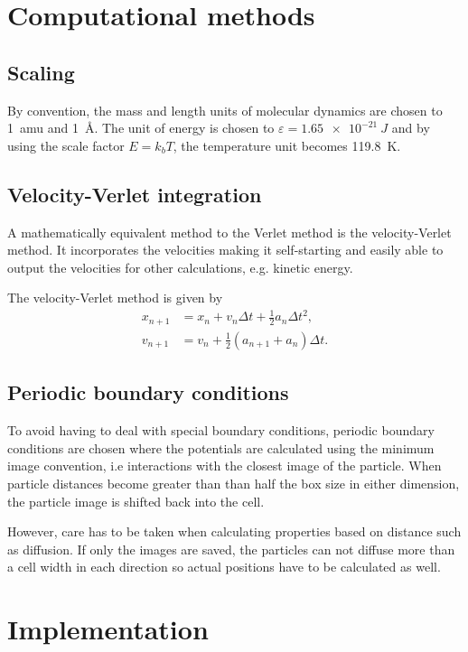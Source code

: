 \documentclass[fleqn]{scrartcl}
\renewcommand{\epsilon}{\varepsilon}
\begin{document}
	\section{Computational methods}
	\subsection{Scaling}
	By convention, the mass and length units of molecular dynamics are chosen to \SI{1}{amu} and \SI{1}{\angstrom}. The unit of energy is chosen to $\epsilon=\SI{1.65e-21}{J}$ and by using the scale factor $E=k_bT$, the temperature unit becomes \SI{119.8}{K}.
	
	\subsection{Velocity-Verlet integration}
	A mathematically equivalent method to the Verlet method is the velocity-Verlet method. It incorporates the velocities making it self-starting and easily able to output the velocities for other calculations, e.g. kinetic energy.
	
	The velocity-Verlet method is given by
	\begin{align}
		x_{n+1} &= x_n + v_n\Delta t + \frac12 a_n\Delta t^2, \\
		v_{n+1} &= v_n + \frac12\left( a_{n+1} + a_n\right)\Delta t.
	\end{align}
	
	\subsection{Periodic boundary conditions}
	To avoid having to deal with special boundary conditions, periodic boundary conditions are chosen where the potentials are calculated using the minimum image convention, i.e interactions with the closest image of the particle. When particle distances become greater than than half the box size in either dimension, the particle image is shifted back into the cell.
	
	However, care has to be taken when calculating properties based on distance such as diffusion. If only the images are saved, the particles can not diffuse more than a cell width in each direction so actual positions have to be calculated as well.
	
	\section{Implementation}
	
\end{document}
